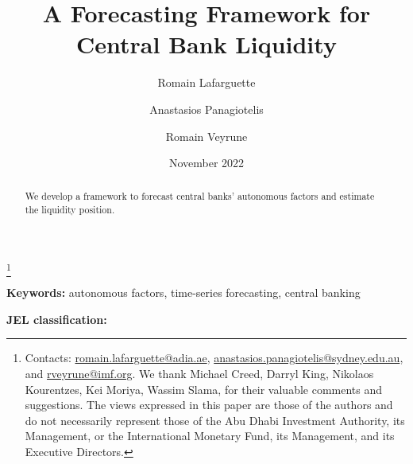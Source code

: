 \documentclass[11pt]{article}
\title{\textbf{A Forecasting Framework for Central Bank Liquidity}}
\author[$\dag$]{Romain Lafarguette}
\author[$*$]{Anastasios Panagiotelis}
\author[$\S$]{Romain Veyrune}
\affil[$\dag$]{Abu Dhabi Investment Authority}
\affil[$*$]{University of Sydney}
\affil[$\S$]{International Monetary Fund}
\date{November 2022}
\newcommand\blfootnote[1]{%
  \begingroup
  \renewcommand\thefootnote{}\footnote{#1}%
  \addtocounter{footnote}{-1}%
  \endgroup
}
\begin{document}
\maketitle
\blfootnote{Contacts:
\url{romain.lafarguette@adia.ae},
\url{anastasios.panagiotelis@sydney.edu.au}, and  \url{rveyrune@imf.org}. We  thank
Michael Creed, Darryl King, Nikolaos Kourentzes, Kei Moriya, Wassim Slama, for
their valuable comments and suggestions. The views expressed in this paper are
those of the authors  and do not necessarily represent those  of the Abu Dhabi
Investment Authority, its Management, or  the International Monetary Fund, its
Management, and its Executive Directors.}

\begin{abstract}
\noindent We develop a framework to forecast central banks' autonomous factors
and estimate the liquidity position.
\end{abstract}
\bigskip

\noindent \textbf{Keywords:} autonomous factors, time-series forecasting, central banking

\medskip

\noindent \textbf{JEL classification:} 

\thispagestyle{empty} 
\newpage
{}







%


%
\end{document}
